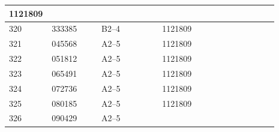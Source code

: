\documentclass[UTF8,10pt,a4paper,fontset=fandol]{ctexart}
\newcommand{\fieldvalue}[1]{#1}
\begin{document}
\begin{center}
\begin{tabular}{|p{0.07\linewidth}|p{0.18\linewidth}|p{0.22\linewidth}|p{0.22\linewidth}|p{0.20\linewidth}|}
\fieldvalue{1121809} & \\ \hline
\fieldvalue{320} &
\fieldvalue{333385} &
\fieldvalue{B2--4} &
\fieldvalue{1121809} & \\ \hline
\fieldvalue{321} &
\fieldvalue{045568} &
\fieldvalue{A2--5} &
\fieldvalue{1121809} & \\ \hline
\fieldvalue{322} &
\fieldvalue{051812} &
\fieldvalue{A2--5} &
\fieldvalue{1121809} & \\ \hline
\fieldvalue{323} &
\fieldvalue{065491} &
\fieldvalue{A2--5} &
\fieldvalue{1121809} & \\ \hline
\fieldvalue{324} &
\fieldvalue{072736} &
\fieldvalue{A2--5} &
\fieldvalue{1121809} & \\ \hline
\fieldvalue{325} &
\fieldvalue{080185} &
\fieldvalue{A2--5} &
\fieldvalue{1121809} & \\ \hline
\fieldvalue{326} &
\fieldvalue{090429} &
\fieldvalue{A2--5} &

\end{tabular}
\end{center}
\end{document}
